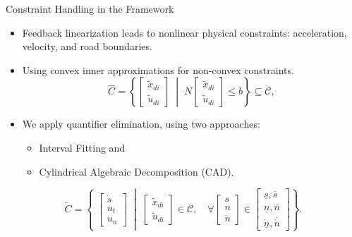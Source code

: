\documentclass[shortpres,aspectratio=43]{beamer}
\newcommand\blfootnote[1]{%
  \begingroup
  \renewcommand\thefootnote{}\footnote{#1}%
  \addtocounter{footnote}{-1}%
  \endgroup
}
\begin{document}
\begin{frame}{Constraint Handling in the Framework}
  \begin{itemize}
    \item Feedback linearization leads to nonlinear physical constraints: acceleration, velocity, and road boundaries.
    \item Using convex inner approximations for non-convex constraints.
          \begin{equation}
            \hat{C} = \left\{ \begin{bmatrix}
              \tilde{x}_{di} \\[2mm] \tilde{u}_{di}
            \end{bmatrix} \; \middle|\;
            N \begin{bmatrix}
              \tilde{x}_{di} \\[2mm] \tilde{u}_{di}
            \end{bmatrix} \leq b
            \right\} \subseteq \mathcal{C},
          \end{equation}
    \item We apply quantifier elimination, using two approaches: \begin{itemize}
            \item Interval Fitting and
            \item Cylindrical Algebraic Decomposition (CAD).
          \end{itemize}
  \end{itemize}
  \begin{equation}
    \tilde{C} =
    \left\{ \;
    \begin{bmatrix}
      \dot{s} \\
      u_t     \\
      u_n
    \end{bmatrix}
    \; \middle|\;
    \begin{bmatrix}
      \tilde{x}_{di} \\ \tilde{u}_{di}
    \end{bmatrix} \in \mathcal{C}, \quad \forall
    \begin{bmatrix}
      s \\
      n \\
      \dot{n}
    \end{bmatrix} \in
    \begin{bmatrix}
      \underline{s}, \overline{s} \\
      \underline{n}, \overline{n} \\
      \underline{\dot{n}}, \overline{\dot{n}}
    \end{bmatrix}
    \right\}.
  \end{equation}
\end{frame}
\end{document}
